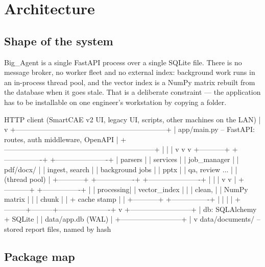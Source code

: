\chapter{Architecture}
\label{ch:architecture}

\section{Shape of the system}

Big\_Agent is a single FastAPI process over a single SQLite file. There is no
message broker, no worker fleet and no external index: background work runs in
an in-process thread pool, and the vector index is a NumPy matrix rebuilt from
the database when it goes stale. That is a deliberate constraint --- the
application has to be installable on one engineer's workstation by copying a
folder.

\begin{shellblock}
HTTP client (SmartCAE v2 UI, legacy UI, scripts, other machines on the LAN)
     |
     v
+---------------------------------------------------------------+
| app/main.py -- FastAPI: routes, auth middleware, OpenAPI       |
+---------------------------------------------------------------+
     |                   |                      |
     v                   v                      v
+-----------+    +----------------+    +----------------------+
| parsers   |    | services       |    | job_manager          |
| pdf/docx/ |    | ingest, search |    | background jobs      |
| pptx      |    | qa, review ... |    | (thread pool)        |
+-----------+    +----------------+    +----------------------+
     |                   |                      |
     v                   v                      |
+-----------+    +----------------+             |
| processing|    | vector_index   |             |
| clean,    |    | NumPy matrix   |             |
| chunk     |    | + cache stamp  |             |
+-----------+    +----------------+             |
     |                   |                      |
     +---------+---------+----------------------+
               v
     +--------------------------+
     | db: SQLAlchemy + SQLite  |
     | data/app.db (WAL)        |
     +--------------------------+
               |
               v
     data/documents/  -- stored report files, named by hash
\end{shellblock}

\section{Package map}

